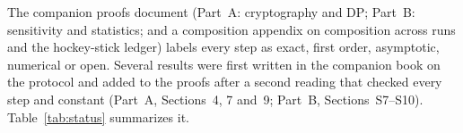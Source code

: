 The companion proofs document (Part~A: cryptography and DP; Part~B: sensitivity and statistics; and a composition appendix on composition across runs and the hockey-stick ledger) labels every step as exact, first order, asymptotic, numerical or open. Several results were first written in the companion book on the protocol and added to the proofs after a second reading that checked every step and constant (Part~A, Sections~4, 7 and~9; Part~B, Sections~S7--S10). Table~\ref{tab:status} summarizes it.

